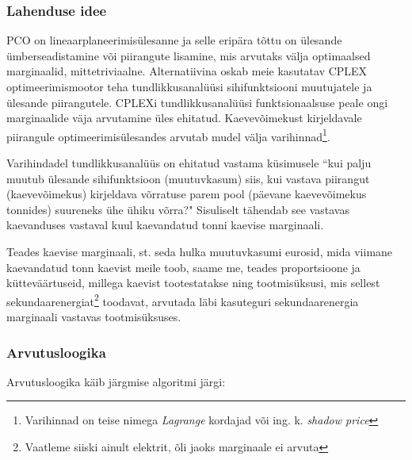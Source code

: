 \documentclass[10pt,a4paper]{article}
\begin{document}
\subsubsection{Lahenduse idee}

PCO on lineaarplaneerimisülesanne ja selle eripära tõttu on ülesande ümber\-seadistamine või piirangute lisamine, mis arvutaks välja optimaalsed marginaalid, mittetriviaalne. Alternatiivina oskab meie kasutatav CPLEX optimeerimismootor teha tundlikkusanalüüsi sihifunktsiooni muutujatele ja ülesande piirangutele. CPLEXi tundlikkusanalüüsi funktsionaalsuse peale ongi marginaalide väja arvutamine üles ehitatud. Kaevevõimekust kirjeldavale piirangule optimeerimisülesandes arvutab mudel välja varihinnad\footnote{Varihinnad on teise nimega \emph{Lagrange} kordajad või ing. k. \emph{shadow price}}. 

Varihindadel tundlikkusanalüüs on ehitatud vastama küsimusele ``kui palju muutub ülesande sihifunktsioon (muutuvkasum) siis, kui vastava piirangut (kaevevõimekus) kirjeldava võrratuse parem pool (päevane kaevevõimekus tonnides) suureneks ühe ühiku võrra?" Sisuliselt tähendab see vastavas kaevanduses vastaval kuul kaevandatud tonni kaevise marginaali. 

Teades kaevise marginaali, st. seda hulka muutuvkasumi eurosid, mida viimane kaevandatud tonn kaevist meile toob, saame me, teades proportsioone ja kütteväärtuseid, millega kaevist tootestatakse ning tootmisüksusi, mis sellest sekundaarenergiat\footnote{Vaatleme siiski ainult elektrit, õli jaoks marginaale ei arvuta} toodavat, arvutada läbi kasuteguri sekundaarenergia marginaali vastavas tootmisüksuses.

\subsubsection{Arvutusloogika}

Arvutusloogika käib järgmise algoritmi järgi:
\end{document}
